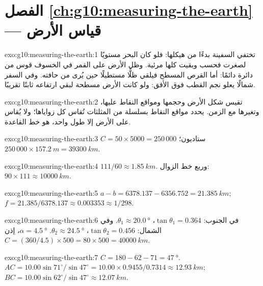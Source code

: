 \section*{الفصل \ref{ch:g10:measuring-the-earth} --- قياس الأرض}

\begin{solution}{exo:g10:measuring-the-earth:1}
تختفي السفينة بدءًا من هيكلها: فلو كان البحر مستويًا لصغرت فحسب وبقيت كلها
مرئية. وظل الأرض على القمر في الخسوف قوس من دائرة دائمًا: أما القرص المسطح
فيلقي ظلًّا مستطيلًا حين يُرى من حافته. وفي السفر شمالًا يعلو نجم القطب فوق
الأفق: ولو كانت الأرض مسطحة لبقي ارتفاعه ثابتًا تقريبًا.
\end{solution}

\begin{solution}{exo:g10:measuring-the-earth:2}
 تقيس شكل الأرض وحجمها ومواقع النقاط عليها، وتغيرها مع
الزمن.  يحدد مواقع النقاط بسلسلة من المثلثات تُقاس كل زواياها؛
ولا يُقاس على الأرض إلا طول واحد، هو خط
القاعدة.
\end{solution}

\begin{solution}{exo:g10:measuring-the-earth:3}
$C = 50 \times 5000 = 250\,000$ ستاديون؛ $250\,000 \times \qty{157.2}{m} =
\qty{39300}{km}$.
\end{solution}

\begin{solution}{exo:g10:measuring-the-earth:4}
$111/60 \approx \qty{1.85}{km}$. وربع خط الزوال: $90 \times 111 \approx
\qty{10000}{km}$.
\end{solution}

\begin{solution}{exo:g10:measuring-the-earth:5}
$a - b = 6378.137 - 6356.752 = \qty{21.385}{km}$;
$f = 21.385/6378.137 \approx 0.003353 \approx 1/298$.
\end{solution}

\begin{solution}{exo:g10:measuring-the-earth:6}
في الجنوب: $\tan\theta_1 = 0.364$، $\theta_1 \approx \qty{20.0}{\degree}$. وفي الشمال:
$\tan\theta_2 = 0.456$، $\theta_2 \approx \qty{24.5}{\degree}$.
$\alpha = \qty{4.5}{\degree}$، إذن $C = (360/4.5) \times 500 = 80 \times 500 =
\qty{40000}{km}$.
\end{solution}

\begin{solution}{exo:g10:measuring-the-earth:7}
$C = 180 - 62 - 71 = \qty{47}{\degree}$.
$AC = 10.00 \sin 71^\circ/\sin 47^\circ = 10.00 \times 0.9455/0.7314 \approx
\qty{12.93}{km}$; $BC = 10.00 \sin 62^\circ/\sin 47^\circ \approx
\qty{12.07}{km}$.
\end{solution}

